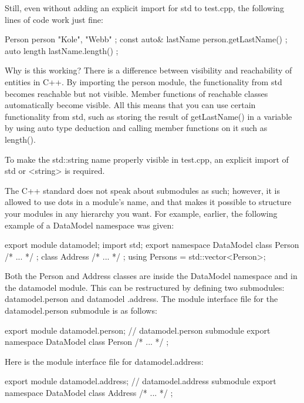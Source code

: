 Still, even without adding an explicit import for std to test.cpp, the following lines of code work just fine:

\begin{cpp}
Person person { "Kole", "Webb" };
const auto& lastName { person.getLastName() };
auto length { lastName.length() };
\end{cpp}

Why is this working? There is a difference between visibility and reachability of entities in C++. By importing the person module, the functionality from std becomes reachable but not visible. Member functions of reachable classes automatically become visible. All this means that you can use certain functionality from std, such as storing the result of getLastName() in a variable by using auto type deduction and calling member functions on it such as length().

To make the std::string name properly visible in test.cpp, an explicit import of std or <string> is required.


The C++ standard does not speak about submodules as such; however, it is allowed to use dots in a module’s name, and that makes it possible to structure your modules in any hierarchy you want. For example, earlier, the following example of a DataModel namespace was given:

\begin{cpp}
export module datamodel;
import std;
export namespace DataModel
{
    class Person { /* ... */ };
    class Address { /* ... */ };
    using Persons = std::vector<Person>;
}
\end{cpp}

Both the Person and Address classes are inside the DataModel namespace and in the datamodel module. This can be restructured by defining two submodules: datamodel.person and datamodel .address. The module interface file for the datamodel.person submodule is as follows:

\begin{cpp}
export module datamodel.person; // datamodel.person submodule
export namespace DataModel { class Person { /* ... */ }; }
\end{cpp}

Here is the module interface file for datamodel.address:

\begin{cpp}
export module datamodel.address; // datamodel.address submodule
export namespace DataModel { class Address { /* ... */ }; }
\end{cpp}

